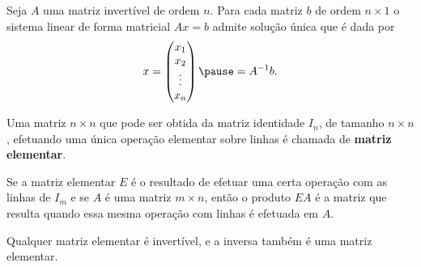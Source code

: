 \documentclass{beamer}
\begin{document}
    \begin{frame}
        \begin{teorema}
            Seja $A$ uma matriz invertível de ordem $n$. \pause Para cada matriz $b$ de ordem $n\times 1$ \pause o sistema linear de forma matricial $Ax = b$ \pause admite solução única que é dada por\pause
            \[
                x = \begin{pmatrix}
                    x_1 \\ x_2 \\ \vdots \\ x_n
                \end{pmatrix} \pause = A^{-1}b.
            \]
        \end{teorema}
    \end{frame}

    \begin{frame}
        \begin{definicao}
            Uma matriz $n\times n$ \pause que pode ser obtida da matriz identidade $I_n$, \pause de tamanho $n\times n$, \pause efetuando uma
            única operação elementar \pause sobre linhas \pause é chamada de \textbf{matriz elementar}.
        \end{definicao}
    \end{frame}

    \begin{frame}
        \begin{teorema}
            Se a matriz elementar $E$ \pause é o resultado de efetuar uma certa operação com as linhas de $I_m$ \pause e se $A$ é uma matriz
            $m \times n$, \pause então o produto $EA$ \pause é a matriz que resulta quando essa mesma operação com linhas é efetuada em $A$.\pause
        \end{teorema}

        \vspace{1cm}

        \begin{teorema}
            Qualquer matriz elementar é invertível, \pause e a inversa também é uma matriz elementar.
        \end{teorema}
    \end{frame}
\end{document}
